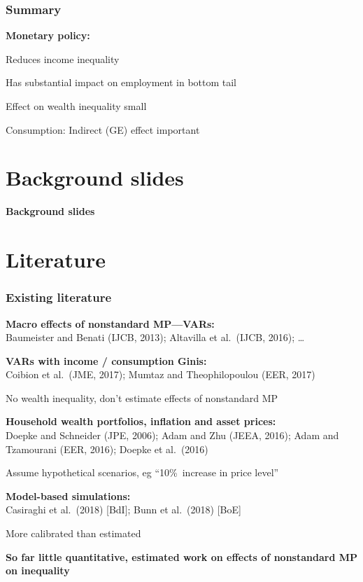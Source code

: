 \documentclass[pdflatex,aspectratio=169]{beamer}
\newcommand{\jemph}[1]{{\color{StataDarkBlue}#1}}
\newcommand{\jbemph}[1]{\textbf{\color{SlideNavy}#1}}
\begin{document}
\begin{frame}\frametitle{\bf Summary}
\jbemph{\large Monetary policy:}\\
\bi
\item \jemph{Reduces income inequality} 
\item Has substantial impact on employment in bottom tail
\item Effect on wealth inequality small
\item \jemph{Consumption:} Indirect (GE) effect important
\ei



\end{frame}



\section{Background slides}
\begin{frame}

\begin{center}
\Large
\jbemph{Background slides}
\end{center}

\end{frame}


\section{Literature}
\begin{frame}\frametitle{\bf Existing literature}
\bi
\setlength{\itemsep}{2mm}
\item \jbemph{Macro effects of nonstandard MP---VARs:}\\
{\footnotesize Baumeister and Benati (IJCB, 2013); Altavilla et al.\ (IJCB, 2016); \dots}
\item \jbemph{VARs with income / consumption Ginis:}\\
{\footnotesize  Coibion et al.\ (JME, 2017); Mumtaz and Theophilopoulou (EER, 2017)}
\bi
\item No \jemph{wealth} inequality, don't estimate effects of \jemph{nonstandard MP}
\ei
\item \jbemph{Household wealth portfolios, inflation and asset prices:}\\
{\footnotesize  Doepke and Schneider (JPE, 2006); Adam and Zhu (JEEA, 2016); Adam and Tzamourani (EER, 2016); Doepke et al.\ (2016)}
\bi
\item Assume \jemph{hypothetical scenarios,} eg ``10\%\ increase in price level''
\ei
\item \jbemph{Model-based simulations:}\\
{\footnotesize Casiraghi et al.\ (2018) [BdI]; Bunn et al.\ (2018) [BoE]}
\bi
\item More calibrated than estimated
\ei
\ei

\bi
\item \jbemph{So far little quantitative, estimated work on effects of nonstandard MP on inequality}
\ei

\end{frame}
\end{document}
